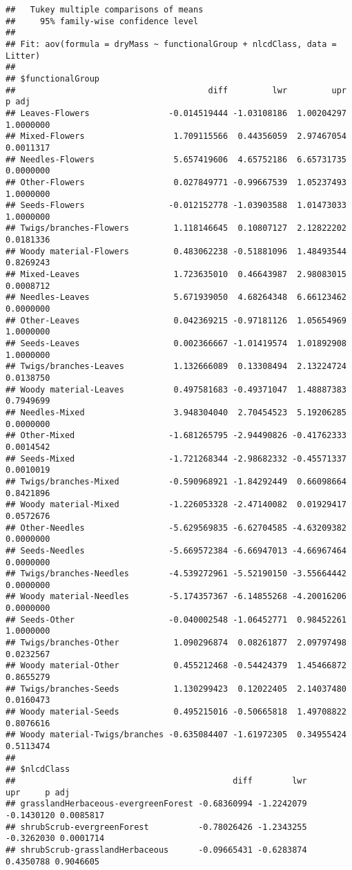 \documentclass[
]{article}
\begin{document}
\begin{verbatim}
##   Tukey multiple comparisons of means
##     95% family-wise confidence level
## 
## Fit: aov(formula = dryMass ~ functionalGroup + nlcdClass, data = Litter)
## 
## $functionalGroup
##                                       diff         lwr         upr     p adj
## Leaves-Flowers                -0.014519444 -1.03108186  1.00204297 1.0000000
## Mixed-Flowers                  1.709115566  0.44356059  2.97467054 0.0011317
## Needles-Flowers                5.657419606  4.65752186  6.65731735 0.0000000
## Other-Flowers                  0.027849771 -0.99667539  1.05237493 1.0000000
## Seeds-Flowers                 -0.012152778 -1.03903588  1.01473033 1.0000000
## Twigs/branches-Flowers         1.118146645  0.10807127  2.12822202 0.0181336
## Woody material-Flowers         0.483062238 -0.51881096  1.48493544 0.8269243
## Mixed-Leaves                   1.723635010  0.46643987  2.98083015 0.0008712
## Needles-Leaves                 5.671939050  4.68264348  6.66123462 0.0000000
## Other-Leaves                   0.042369215 -0.97181126  1.05654969 1.0000000
## Seeds-Leaves                   0.002366667 -1.01419574  1.01892908 1.0000000
## Twigs/branches-Leaves          1.132666089  0.13308494  2.13224724 0.0138750
## Woody material-Leaves          0.497581683 -0.49371047  1.48887383 0.7949699
## Needles-Mixed                  3.948304040  2.70454523  5.19206285 0.0000000
## Other-Mixed                   -1.681265795 -2.94490826 -0.41762333 0.0014542
## Seeds-Mixed                   -1.721268344 -2.98682332 -0.45571337 0.0010019
## Twigs/branches-Mixed          -0.590968921 -1.84292449  0.66098664 0.8421896
## Woody material-Mixed          -1.226053328 -2.47140082  0.01929417 0.0572676
## Other-Needles                 -5.629569835 -6.62704585 -4.63209382 0.0000000
## Seeds-Needles                 -5.669572384 -6.66947013 -4.66967464 0.0000000
## Twigs/branches-Needles        -4.539272961 -5.52190150 -3.55664442 0.0000000
## Woody material-Needles        -5.174357367 -6.14855268 -4.20016206 0.0000000
## Seeds-Other                   -0.040002548 -1.06452771  0.98452261 1.0000000
## Twigs/branches-Other           1.090296874  0.08261877  2.09797498 0.0232567
## Woody material-Other           0.455212468 -0.54424379  1.45466872 0.8655279
## Twigs/branches-Seeds           1.130299423  0.12022405  2.14037480 0.0160473
## Woody material-Seeds           0.495215016 -0.50665818  1.49708822 0.8076616
## Woody material-Twigs/branches -0.635084407 -1.61972305  0.34955424 0.5113474
## 
## $nlcdClass
##                                            diff        lwr        upr     p adj
## grasslandHerbaceous-evergreenForest -0.68360994 -1.2242079 -0.1430120 0.0085817
## shrubScrub-evergreenForest          -0.78026426 -1.2343255 -0.3262030 0.0001714
## shrubScrub-grasslandHerbaceous      -0.09665431 -0.6283874  0.4350788 0.9046605
\end{verbatim}
\end{document}
